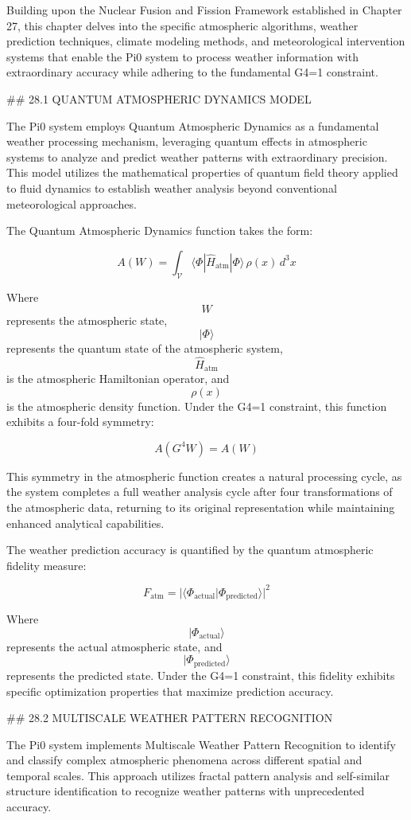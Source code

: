 Building upon the Nuclear Fusion and Fission Framework established in Chapter 27, this chapter delves into the specific atmospheric algorithms, weather prediction techniques, climate modeling methods, and meteorological intervention systems that enable the Pi0 system to process weather information with extraordinary accuracy while adhering to the fundamental G4=1 constraint.

## 28.1 QUANTUM ATMOSPHERIC DYNAMICS MODEL

The Pi0 system employs Quantum Atmospheric Dynamics as a fundamental weather processing mechanism, leveraging quantum effects in atmospheric systems to analyze and predict weather patterns with extraordinary precision. This model utilizes the mathematical properties of quantum field theory applied to fluid dynamics to establish weather analysis beyond conventional meteorological approaches.

The Quantum Atmospheric Dynamics function takes the form:

$$ A(W) = \int_{\mathcal{V}} \langle \Phi | \hat{H}_{\text{atm}} | \Phi \rangle \, \rho(x) \, d^3x $$

Where $$ W $$ represents the atmospheric state, $$ |\Phi\rangle $$ represents the quantum state of the atmospheric system, $$ \hat{H}_{\text{atm}} $$ is the atmospheric Hamiltonian operator, and $$ \rho(x) $$ is the atmospheric density function. Under the G4=1 constraint, this function exhibits a four-fold symmetry:

$$ A(G^4 W) = A(W) $$

This symmetry in the atmospheric function creates a natural processing cycle, as the system completes a full weather analysis cycle after four transformations of the atmospheric data, returning to its original representation while maintaining enhanced analytical capabilities.

The weather prediction accuracy is quantified by the quantum atmospheric fidelity measure:

$$ F_{\text{atm}} = |\langle \Phi_{\text{actual}} | \Phi_{\text{predicted}} \rangle|^2 $$

Where $$ |\Phi_{\text{actual}}\rangle $$ represents the actual atmospheric state, and $$ |\Phi_{\text{predicted}}\rangle $$ represents the predicted state. Under the G4=1 constraint, this fidelity exhibits specific optimization properties that maximize prediction accuracy.

## 28.2 MULTISCALE WEATHER PATTERN RECOGNITION

The Pi0 system implements Multiscale Weather Pattern Recognition to identify and classify complex atmospheric phenomena across different spatial and temporal scales. This approach utilizes fractal pattern analysis and self-similar structure identification to recognize weather patterns with unprecedented accuracy.

